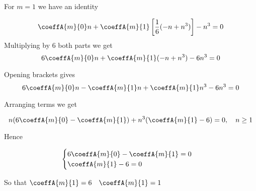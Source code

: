 For $m=1$ we have an identity

\begin{equation*}
    \coeffA{m}{0} n + \coeffA{m}{1} \left[ \frac{1}{6} (-n + n^3) \right] - n^3 = 0
\end{equation*}
Multiplying by 6 both parts we get
\begin{equation*}
    6 \coeffA{m}{0} n + \coeffA{m}{1} (-n + n^3)  - 6 n^3 = 0
\end{equation*}

Opening brackets gives
\begin{equation*}
    6 \coeffA{m}{0} n - \coeffA{m}{1} n + \coeffA{m}{1} n^3  - 6 n^3 = 0
\end{equation*}

Arranging terms we get

\begin{equation*}
    n (6\coeffA{m}{0} - \coeffA{m}{1})+ n^3 (\coeffA{m}{1} - 6)  = 0, \quad n \geq 1
\end{equation*}

Hence

\begin{equation*}
    \begin{cases}
        6\coeffA{m}{0} - \coeffA{m}{1} = 0 \\
        \coeffA{m}{1} - 6 = 0
    \end{cases}
\end{equation*}

So that $\coeffA{m}{1}=6 \quad \coeffA{m}{1} = 1$